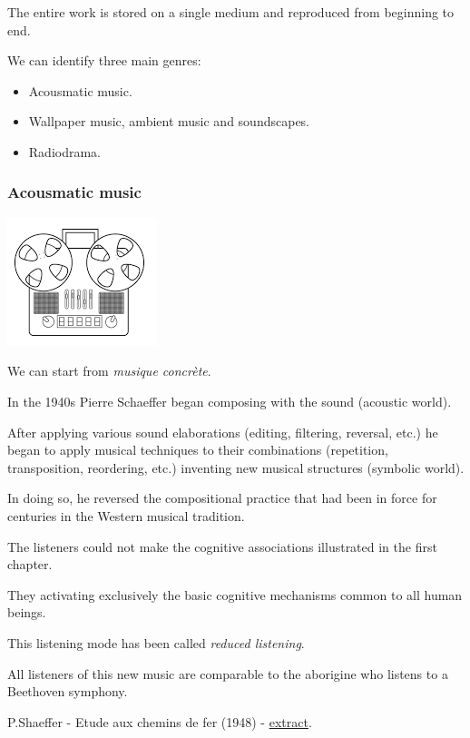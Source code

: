 The entire work is stored on a single medium and reproduced from beginning to end.

We can identify three main genres:

\begin{itemize}
\tightlist
\item Acousmatic music.
\item Wallpaper music, ambient music and soundscapes.
\item Radiodrama.
\end{itemize}

\subsubsection{Acousmatic music }\label{acousmatic-music}

\begin{center}
\includegraphics[scale=0.5]{../img/tape.png}
\end{center}

We can start from \textit{musique concrète}.

In the 1940s Pierre Schaeffer began composing with the sound (acoustic world).

After applying various sound elaborations (editing, filtering, reversal, etc.) he began to apply musical techniques to their combinations (repetition, transposition, reordering, etc.) inventing new musical structures (symbolic world).

In doing so, he reversed the compositional practice that had been in force for centuries in the Western musical tradition.

The listeners could not make the cognitive associations illustrated in the first chapter.

They activating exclusively the basic cognitive mechanisms common to all human beings.

This listening mode has been called \textit{reduced listening}.

All listeners of this new music are comparable to the aborigine who listens to a Beethoven symphony.

P.Shaeffer - Etude aux chemins de fer (1948) - \href{https://github.com/musicaecodice/EMC/blob/main/2_instruments/suoni/shaeffer.mp3}{extract}.

